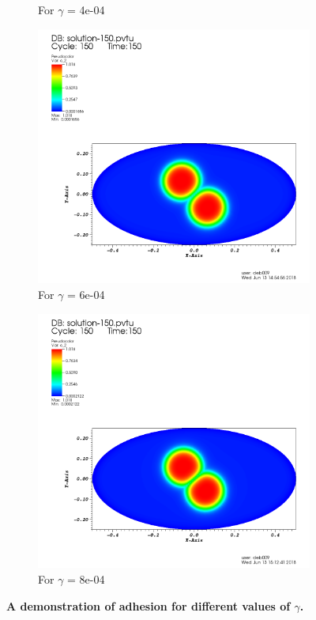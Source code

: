 \documentclass[idxtotoc,hyperref,openany]{labbook} %
\begin{document}
\begin{figure}[h!]
\begin{subfigure}[h!]{0.4\textwidth}
		\caption{For $\gamma$ = 4e-04}
		\label{fig:4e_04.png}
	\end{subfigure}
    \begin{subfigure}[h!]{0.4\textwidth}
    	\includegraphics[width=\textwidth]{6e_04.png}
    	\caption{For $\gamma$ = 6e-04}
    	\label{fig:6e_04.png}
    \end{subfigure}
    \begin{subfigure}[h!]{0.4\textwidth}
    	\includegraphics[width=\textwidth]{8e_04.png}
    	\caption{For $\gamma$ = 8e-04}
    	\label{fig:8e_04.png}
    \end{subfigure}
	\caption\Large\textbf{A demonstration of adhesion for different values of $\gamma$.}
\end{figure}
\end{document}
